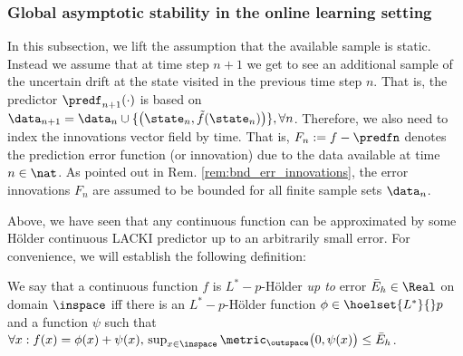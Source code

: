\subsubsection{Global asymptotic stability in the online learning setting}
In this subsection, we lift the assumption that the available sample is static. Instead we assume that at time step $n+1$ we get to see an additional sample of the uncertain drift at the state visited in the previous time step $n$. 
That is, the predictor $\predf_{n+1}(\cdot)$ is based on $\data_{n+1} = \data_n \cup \{ \bigl(\state_n, \tilde f(\state_n) \bigr)\}, \forall n $.
Therefore, we also need to index the innovations vector field by time. That is, $F_n := f - \predfn$ denotes the prediction error function (or innovation) due to the data available at time $n \in \nat$. 
As pointed out in Rem. \ref{rem:bnd_err_innovations}, the error innovations $F_n$ are assumed to be bounded for all finite sample sets $\data_n$. 




Above, we have seen that any continuous function can be approximated by some H\"older continuous LACKI predictor up to an arbitrarily small error. 
For convenience, we will establish the following definition:

\begin{defn}
We say that a continuous function $f$ is $L^*-p$-H\"older \emph{up to} error $\bar E_h \in \Real$ on domain $\inspace$ iff there is an $L^*-p$-H\"older function $\phi \in \hoelset {L^*} { } p$ and a function $\psi$ such that $\forall x: f(x) = \phi(x)+\psi(x), \, \sup_{x \in \inspace} \metric_\outspace\bigl(0,\psi(x)\bigr) \leq \bar E_h$.
\end{defn}


